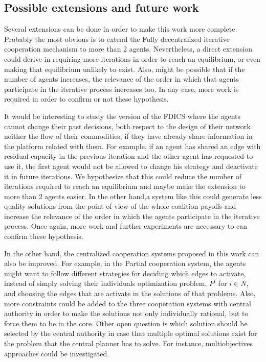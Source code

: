 \documentclass{article}
\begin{document}
\subsection{Possible extensions and future work}

Several extensions can be done in order to make this work more complete. Probably the most obvious is to extend the Fully decentralized iterative cooperation mechanism to more than 2 agents. Nevertheless, a direct extension could derive in requiring more iterations in order to reach an equilibrium, or even making that equilibrium unlikely to exist. Also, might be possible that if the number of agents increases, the relevance of the order in which that agents participate in the iterative process increases too. In any case, more work is required in order to confirm or not these hypothesis.

It would be interesting to study the version of the FDICS where the agents cannot change their past decisions, both respect to the design of their network neither the flow of their commodities, if they have already share information in the platform related with them. For example, if an agent has shared an edge with residual capacity in the previous iteration and the other agent has requested to use it, the first agent would not be allowed to change his strategy and deactivate it in future iterations. We hypothesize that this could reduce the number of iterations required  to reach an equilibrium and maybe make the extension to more than 2 agents easier. In the other hand,a system like this could generate less quality solutions from the point of view of the whole coalition payoffs and increase the relevance of the order in which the agents participate in the iterative process. Once again, more work and further experiments are necessary to can confirm these hypothesis.

In the other hand, the centralized cooperation systems proposed in this work can also be improved. For example, in the Partial cooperation system, the agents might want to follow different strategies for deciding which edges to activate, instead of simply solving their individuals optimization problem, $P^i$ for $i\in N$, and choosing the edges that are activate in the solutions of that problems. Also, more constraints could be added to the three cooperation systems with central authority in order to make the solutions not only individually rational, but to force them to be in the core. Other open question is which solution should be selected by the central authority in case that multiple optimal solutions exist for the problem that the central planner has to solve. For instance, multiobjectives approaches could be investigated.
\end{document}
